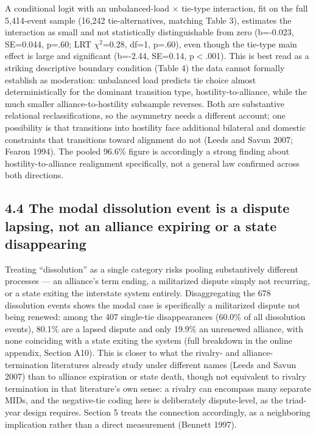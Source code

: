 \documentclass[Afour,sageh,times,doublespace]{sagej}
\begin{document}
A conditional logit with an unbalanced-load $\times$ tie-type interaction, fit on the full 5,414-event sample (16,242 tie-alternatives, matching Table 3), estimates the interaction as small and not statistically distinguishable from zero (b=-0.023, SE=0.044, p=.60; LRT $\chi^2$=0.28, df=1, p=.60), even though the tie-type main effect is large and significant (b=-2.44, SE=0.14, p$<$.001). This is best read as a striking descriptive boundary condition (Table 4) the data cannot formally establish as moderation: unbalanced load predicts tie choice almost deterministically for the dominant transition type, hostility-to-alliance, while the much smaller alliance-to-hostility subsample reverses. Both are substantive relational reclassifications, so the asymmetry needs a different account; one possibility is that transitions into hostility face additional bilateral and domestic constraints that transitions toward alignment do not (Leeds and Savun 2007; Fearon 1994). The pooled 96.6\% figure is accordingly a strong finding about hostility-to-alliance realignment specifically, not a general law confirmed across both directions.

\subsection*{4.4 The modal dissolution event is a dispute lapsing, not an alliance expiring or a state disappearing}

Treating ``dissolution'' as a single category risks pooling substantively different processes --- an alliance's term ending, a militarized dispute simply not recurring, or a state exiting the interstate system entirely. Disaggregating the 678 dissolution events shows the modal case is specifically a militarized dispute not being renewed: among the 407 single-tie disappearances (60.0\% of all dissolution events), 80.1\% are a lapsed dispute and only 19.9\% an unrenewed alliance, with none coinciding with a state exiting the system (full breakdown in the online appendix, Section A10). This is closer to what the rivalry- and alliance-termination literatures already study under different names (Leeds and Savun 2007) than to alliance expiration or state death, though not equivalent to rivalry termination in that literature's own sense: a rivalry can encompass many separate MIDs, and the negative-tie coding here is deliberately dispute-level, as the triad-year design requires. Section 5 treats the connection accordingly, as a neighboring implication rather than a direct measurement (Bennett 1997).
\end{document}
